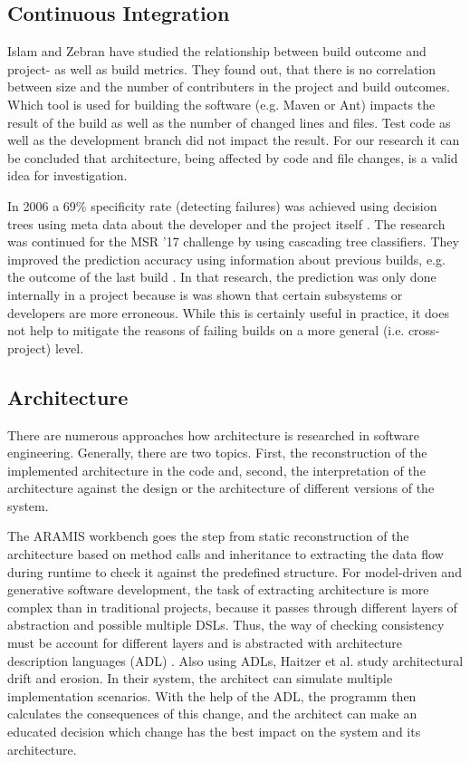 \documentclass[conference]{IEEEtran}
\begin{document}
\subsection{Continuous Integration}

Islam and Zebran \cite{FailsCorr} have studied the relationship between build outcome and project- as well as build metrics. They found out, that there is no correlation between size and the number of contributers in the project and build outcomes. Which tool is used for building the software (e.g. Maven or Ant) impacts the result of the build as well as the number of changed lines and files. Test code as well as the development branch did not impact the result. For our research it can be concluded that architecture, being affected by code and file changes, is a valid idea for investigation. 

In 2006 a 69\% specificity rate (detecting failures) was achieved using decision trees using meta data about the developer and the project itself \cite{Pred-Tree}.
The research was continued for the MSR '17 challenge by using cascading tree classifiers. They improved the prediction accuracy using information about previous builds, e.g. the outcome of the last build \cite{Pred-Cascade}. 
In that research, the prediction was only done internally in a project because is was shown that certain subsystems or developers are more erroneous. While this is certainly useful in practice, it does not help to mitigate the reasons of failing builds on a more general (i.e. cross-project) level.

\subsection{Architecture}

There are numerous approaches how architecture is researched in software engineering. Generally, there are two topics. First, the reconstruction of the implemented architecture in the code and, second, the interpretation of the architecture against the design or the architecture of different versions of the system.

The ARAMIS workbench \cite{Aramis} goes the step from static reconstruction of the architecture based on method calls and inheritance to extracting the data flow during runtime to check it against the predefined structure. 
For model-driven and generative software development, the task of extracting architecture is more complex than in traditional projects, because it passes through different layers of abstraction and possible multiple DSLs. 
Thus, the way of checking consistency must be account for different layers and is abstracted with architecture description languages (ADL) \cite{ArcCons,Arc-MDSE}. 
Also using ADLs, Haitzer et al. \cite{Arc-Decision} study architectural drift and erosion. In their system, the architect can simulate multiple implementation scenarios. With the help of the ADL, the programm then calculates the consequences of this change, and the architect can make an educated decision which change has the best impact on the system and its architecture. 
\end{document}
